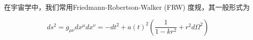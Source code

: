 
在宇宙学中，我们常用Friedmann-Robertson-Walker (FRW) 度规，其一般形式为

\begin{equation}
ds^2=g_{\mu\nu}dx^{\mu}dx^{\nu}=-dt^2+a(t)^2(\frac{1}{1-kr^2}+r^2 d\Omega^2)
\end{equation}

